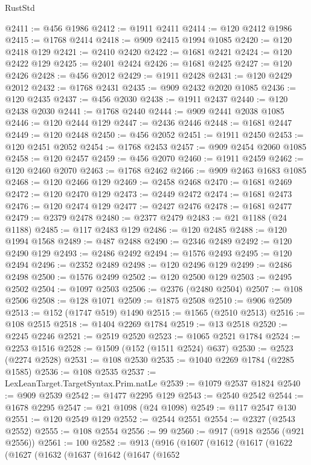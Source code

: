 \begin{lexlean}{RustStd}
\begin{coremodule}
@2411 := @456 @1986
@2412 := @1911 @2411
@2414 := @120 @2412 @1986
@2415 := @1768 @2414
@2418 := @909 @2415 @1994 @1085
@2420 := @120 @2418 @129
@2421 := @2410 @2420
@2422 := @1681 @2421
@2424 := @120 @2422 @129
@2425 := @2401 @2424
@2426 := @1681 @2425
@2427 := @120 @2426
@2428 := @456 @2012
@2429 := @1911 @2428
@2431 := @120 @2429 @2012
@2432 := @1768 @2431
@2435 := @909 @2432 @2020 @1085
@2436 := @120 @2435
@2437 := @456 @2030
@2438 := @1911 @2437
@2440 := @120 @2438 @2030
@2441 := @1768 @2440
@2444 := @909 @2441 @2038 @1085
@2446 := @120 @2444 @129
@2447 := @2436 @2446
@2448 := @1681 @2447
@2449 := @120 @2448
@2450 := @456 @2052
@2451 := @1911 @2450
@2453 := @120 @2451 @2052
@2454 := @1768 @2453
@2457 := @909 @2454 @2060 @1085
@2458 := @120 @2457
@2459 := @456 @2070
@2460 := @1911 @2459
@2462 := @120 @2460 @2070
@2463 := @1768 @2462
@2466 := @909 @2463 @1683 @1085
@2468 := @120 @2466 @129
@2469 := @2458 @2468
@2470 := @1681 @2469
@2472 := @120 @2470 @129
@2473 := @2449 @2472
@2474 := @1681 @2473
@2476 := @120 @2474 @129
@2477 := @2427 @2476
@2478 := @1681 @2477
@2479 := @2379 @2478
@2480 := @2377 @2479
@2483 := @21 @1188 (@24 @1188)
@2485 := @117 @2483 @129
@2486 := @120 @2485
@2488 := @120 @1994 @1568
@2489 := @487 @2488
@2490 := @2346 @2489
@2492 := @120 @2490 @129
@2493 := @2486 @2492
@2494 := @1576 @2493
@2495 := @120 @2494
@2496 := @2352 @2489
@2498 := @120 @2496 @129
@2499 := @2486 @2498
@2500 := @1576 @2499
@2502 := @120 @2500 @129
@2503 := @2495 @2502
@2504 := @1097 @2503
@2506 := @2376 (@2480 @2504)
@2507 := @108 @2506
@2508 := @128 @1071
@2509 := @1875 @2508
@2510 := @906 @2509
@2513 := @152 (@1747 @519) @1490
@2515 := @1565 (@2510 @2513)
@2516 := @108 @2515
@2518 := @1404 @2269 @1784
@2519 := @13 @2518
@2520 := @2245 @2246
@2521 := @2519 @2520
@2523 := @1065 @2521 @1784
@2524 := @2253 @1516
@2528 := @1509 (@152 (@1511 @2524) @637)
@2530 := @2523 (@2274 @2528)
@2531 := @108 @2530
@2535 := @1040 @2269 @1784 (@2285 @1585)
@2536 := @108 @2535
@2537 := LexLeanTarget.TargetSyntax.Prim.natLe
@2539 := @1079 @2537 @1824
@2540 := @909 @2539
@2542 := @1477 @2295 @129
@2543 := @2540 @2542
@2544 := @1678 @2295
@2547 := @21 @1098 (@24 @1098)
@2549 := @117 @2547 @130
@2551 := @120 @2549 @129
@2552 := @2544 @2551
@2554 := @2327 (@2543 @2552)
@2555 := @108 @2554
@2556 := 99
@2560 := @917 (@918 @2556 (@921 @2556))
@2561 := 100
@2582 := @913
    (@916
      (@1607
        (@1612
          (@1617
            (@1622
              (@1627
                (@1632
                  (@1637
                    (@1642
                      (@1647
                        (@1652

\end{coremodule}
\end{lexlean}
